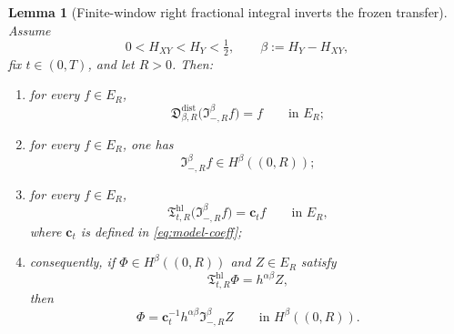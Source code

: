 \documentclass[11pt,a4paper]{amsart}
\theoremstyle{plain}
\newtheorem{lemma}[theorem]{Lemma}
\theoremstyle{definition}
\theoremstyle{remark}
\begin{document}
\begin{lemma}[Finite-window right fractional integral inverts the frozen transfer]
\label{lem:window-frozen-inverse}
Assume
\[
0<H_{XY}<H_Y<\tfrac12,
\qquad
\beta:=H_Y-H_{XY},
\]
fix \(t\in(0,T)\), and let \(R>0\). Then:
\begin{enumerate}[label=(\roman*)]
\item for every \(f\in E_R\),
\begin{equation}\label{eq:window-fractional-left-inverse}
\mathfrak D_{\beta,R}^{\mathrm{dist}}
\bigl(
\mathfrak I_{-,R}^{\beta}f
\bigr)
=
f
\qquad\text{in }E_R;
\end{equation}
\item for every \(f\in E_R\), one has
\[
\mathfrak I_{-,R}^{\beta}f\in H^\beta((0,R));
\]
\item for every \(f\in E_R\),
\begin{equation}\label{eq:window-frozen-inverse}
\mathfrak T_{t,R}^{\mathrm{hl}}
\bigl(
\mathfrak I_{-,R}^{\beta}f
\bigr)
=
\mathbf c_t f
\qquad\text{in }E_R,
\end{equation}
where \(\mathbf c_t\) is defined in \eqref{eq:model-coeff};
\item consequently, if \(\Phi\in H^\beta((0,R))\) and \(Z\in E_R\) satisfy
\begin{equation}\label{eq:window-frozen-exact}
\mathfrak T_{t,R}^{\mathrm{hl}}\Phi=h^{\alpha\beta}Z,
\end{equation}
then
\begin{equation}\label{eq:window-frozen-exact-inverse}
\Phi
=
\mathbf c_t^{-1}h^{\alpha\beta}
\mathfrak I_{-,R}^{\beta}Z
\qquad\text{in }H^\beta((0,R)).
\end{equation}
\end{enumerate}
\end{lemma}
\end{document}
